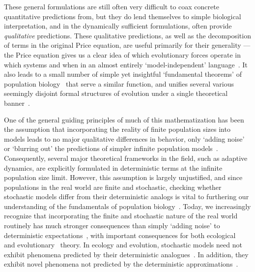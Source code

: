 These general formulations are still often very difficult to coax concrete quantitative predictions from, but they do lend themselves to simple biological interpretation, and in the dynamically sufficient formulations, often provide \emph{qualitative} predictions. These qualitative predictions, as well as the decomposition of terms in the original Price equation, are useful primarily for their generality --- the Price equation gives us a clear idea of which evolutionary forces operate in which systems and when in an almost entirely `model-independent' language~\citep{okasha_evolution_2006,frank_natural_2012,queller_fundamental_2017,luque_one_2017}. It also leads to a small number of simple yet insightful `fundamental theorems' of population biology~\citep{queller_fundamental_2017, lion_theoretical_2018, lehtonen_price_2018} that serve a similar function, and unifies several various seemingly disjoint formal structures of evolution under a single theoretical banner~\citep{ lehtonen_price_2020, luque_mirror_2021}.

One of the general guiding principles of much of this mathematization has been the assumption that incorporating the reality of finite population sizes into models leads to no major qualitative differences in behavior, only `adding noise' or `blurring out' the predictions of simpler infinite population models~\citep{page_unifying_2002}. Consequently, several major theoretical frameworks in the field, such as adaptive dynamics, are explicitly formulated in deterministic terms at the infinite population size limit. However, this assumption is largely unjustified, and since populations in the real world are finite and stochastic, checking whether stochastic models differ from their deterministic analogs is vital to furthering our understanding of the fundamentals of population biology~\citep{hastings_transients_2004, coulson_skeletons_2004, shoemaker_integrating_2020}. Today, we increasingly recognize that incorporating the finite and stochastic nature of the real world routinely has much stronger consequences than simply `adding noise' to deterministic expectations~\citep{boettiger_noise_2018}, with important consequences for both ecological~\citep{schreiber_does_2022} and evolutionary~\citep{delong_stochasticity_2023} theory. In ecology and evolution, stochastic models need not exhibit phenomena predicted by their deterministic analogues~\citep{proulx_what_2005, johansson_will_2006, claessen_delayed_2007,  wakano_evolutionary_2013, debarre_evolutionary_2016, johnson_two-dimensional_2021}. In addition, they exhibit novel phenomena not predicted by the deterministic approximations~\citep{rogers_demographic_2012, rogers_spontaneous_2012, rogers_modes_2015, veller_drift-induced_2017, delong_stochasticity_2023}.

